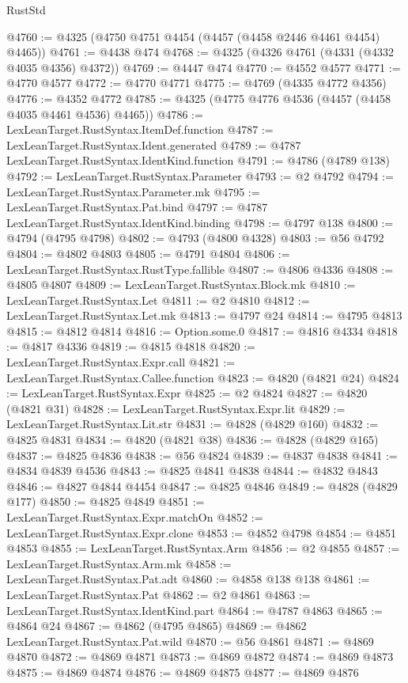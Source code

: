 \begin{lexlean}{RustStd}
\begin{coremodule}
{\begin{coremodule}
{{{{{{{{{{{{{{{{{{{{{{{{{{{{{{{{{{{{{{{{{{{{{{{{{{{{{{{{{{{{{{{{{{{{{{{{{{{{{{{{@4760 := @4325 (@4750 @4751 @4454 (@4457 (@4458 @2446 @4461 @4454) @4465))
@4761 := @4438 @474
@4768 := @4325 (@4326 @4761 (@4331 (@4332 @4035 @4356) @4372))
@4769 := @4447 @474
@4770 := @4552 @4577
@4771 := @4770 @4577
@4772 := @4770 @4771
@4775 := @4769 (@4335 @4772 @4356)
@4776 := @4352 @4772
@4785 := @4325 (@4775 @4776 @4536 (@4457 (@4458 @4035 @4461 @4536) @4465))
@4786 := LexLeanTarget.RustSyntax.ItemDef.function
@4787 := LexLeanTarget.RustSyntax.Ident.generated
@4789 := @4787 LexLeanTarget.RustSyntax.IdentKind.function
@4791 := @4786 (@4789 @138)
@4792 := LexLeanTarget.RustSyntax.Parameter
@4793 := @2 @4792
@4794 := LexLeanTarget.RustSyntax.Parameter.mk
@4795 := LexLeanTarget.RustSyntax.Pat.bind
@4797 := @4787 LexLeanTarget.RustSyntax.IdentKind.binding
@4798 := @4797 @138
@4800 := @4794 (@4795 @4798)
@4802 := @4793 (@4800 @4328)
@4803 := @56 @4792
@4804 := @4802 @4803
@4805 := @4791 @4804
@4806 := LexLeanTarget.RustSyntax.RustType.fallible
@4807 := @4806 @4336
@4808 := @4805 @4807
@4809 := LexLeanTarget.RustSyntax.Block.mk
@4810 := LexLeanTarget.RustSyntax.Let
@4811 := @2 @4810
@4812 := LexLeanTarget.RustSyntax.Let.mk
@4813 := @4797 @24
@4814 := @4795 @4813
@4815 := @4812 @4814
@4816 := Option.some.{0}
@4817 := @4816 @4334
@4818 := @4817 @4336
@4819 := @4815 @4818
@4820 := LexLeanTarget.RustSyntax.Expr.call
@4821 := LexLeanTarget.RustSyntax.Callee.function
@4823 := @4820 (@4821 @24)
@4824 := LexLeanTarget.RustSyntax.Expr
@4825 := @2 @4824
@4827 := @4820 (@4821 @31)
@4828 := LexLeanTarget.RustSyntax.Expr.lit
@4829 := LexLeanTarget.RustSyntax.Lit.str
@4831 := @4828 (@4829 @160)
@4832 := @4825 @4831
@4834 := @4820 (@4821 @38)
@4836 := @4828 (@4829 @165)
@4837 := @4825 @4836
@4838 := @56 @4824
@4839 := @4837 @4838
@4841 := @4834 @4839 @4536
@4843 := @4825 @4841 @4838
@4844 := @4832 @4843
@4846 := @4827 @4844 @4454
@4847 := @4825 @4846
@4849 := @4828 (@4829 @177)
@4850 := @4825 @4849
@4851 := LexLeanTarget.RustSyntax.Expr.matchOn
@4852 := LexLeanTarget.RustSyntax.Expr.clone
@4853 := @4852 @4798
@4854 := @4851 @4853
@4855 := LexLeanTarget.RustSyntax.Arm
@4856 := @2 @4855
@4857 := LexLeanTarget.RustSyntax.Arm.mk
@4858 := LexLeanTarget.RustSyntax.Pat.adt
@4860 := @4858 @138 @138
@4861 := LexLeanTarget.RustSyntax.Pat
@4862 := @2 @4861
@4863 := LexLeanTarget.RustSyntax.IdentKind.part
@4864 := @4787 @4863
@4865 := @4864 @24
@4867 := @4862 (@4795 @4865)
@4869 := @4862 LexLeanTarget.RustSyntax.Pat.wild
@4870 := @56 @4861
@4871 := @4869 @4870
@4872 := @4869 @4871
@4873 := @4869 @4872
@4874 := @4869 @4873
@4875 := @4869 @4874
@4876 := @4869 @4875
@4877 := @4869 @4876
}}}}}}}}}}}}}}}}}}}}}}}}}}}}}}}}}}}}}}}}}}}}}}}}}}}}}}}}}}}}}}}}}}}}}}}}}}}}}}}}
\end{coremodule}}
\end{coremodule}
\end{lexlean}
